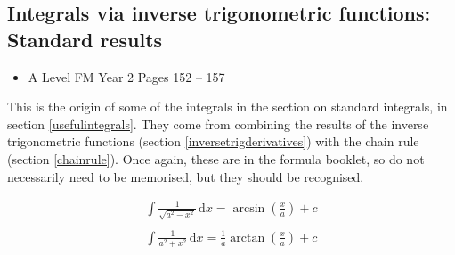 \documentclass[11pt, a4paper]{article}
\begin{document}
\vspace{0.5cm}


\subsection{Integrals via inverse trigonometric functions: Standard results}
\begin{itemize}
\item A Level FM Year 2 \hspace{1cm} \phantom{AS /} Pages 152 -- 157
\end{itemize} \par
This is the origin of some of the integrals in the section on standard integrals, in section \ref{usefulintegrals}. They come from combining the results of the inverse trigonometric functions (section \ref{inversetrigderivatives}) with the chain rule (section \ref{chainrule}). Once again, these are in the formula booklet, so do not necessarily need to be memorised, but they should be recognised.

\begin{gather*}
\int\frac{1}{\sqrt{a^{2}-x^{2}}}\,\mathrm{d}x=\arcsin\left( \frac{x}{a} \right) + c \\
 \\
\int\frac{1}{a^{2}+x^{2}}\,\mathrm{d}x=\frac{1}{a}\arctan\left( \frac{x}{a} \right) + c \\
\end{gather*}

\vspace{0.5cm}
\end{document}
